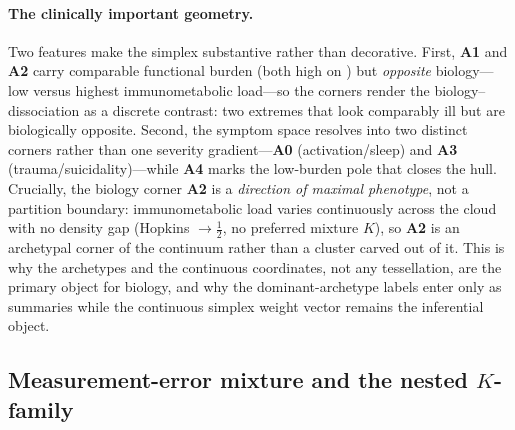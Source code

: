 \paragraph{The clinically important geometry.} Two features make the simplex
substantive rather than decorative. First, \textbf{A1} and \textbf{A2} carry comparable
functional burden (both high on \Gfac{}) but \emph{opposite} biology---low versus highest
immunometabolic load---so the corners render the biology--\Gfac{} dissociation as
a discrete contrast: two extremes that look comparably ill but are biologically opposite.
Second, the symptom space resolves into two distinct corners rather than one severity
gradient---\textbf{A0} (activation/sleep) and \textbf{A3} (trauma/suicidality)---while
\textbf{A4} marks the low-burden pole that closes the hull. Crucially, the biology corner
\textbf{A2} is a \emph{direction of maximal phenotype}, not a partition boundary:
immunometabolic load varies continuously across the cloud with no density gap (Hopkins
$\to\tfrac12$, no preferred mixture $K$), so \textbf{A2} is an archetypal corner of the
continuum rather than a cluster carved out of it. This is why the archetypes and the
continuous coordinates, not any tessellation, are the primary object for biology,
and why the dominant-archetype labels enter only as summaries while the continuous
simplex weight vector remains the inferential object.

\subsection{Measurement-error mixture and the nested \texorpdfstring{$K$}{K}-family}

